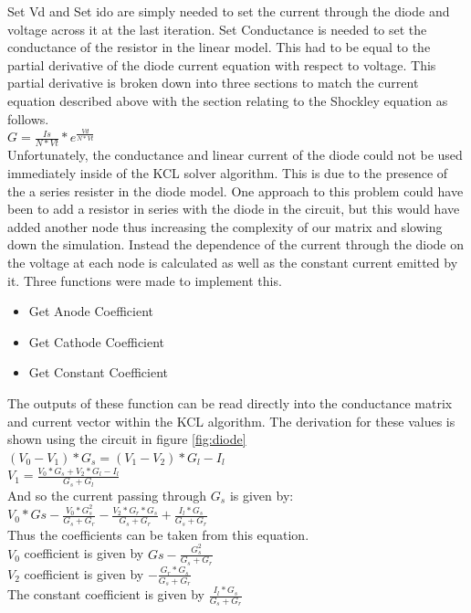 \documentclass{article}
\begin{document}
Set Vd and Set ido are simply needed to set the current through the diode and voltage across it at the last iteration. Set Conductance is needed to set the conductance of the resistor in the linear model. This had to be equal to the partial derivative of the diode current equation with respect to voltage. This partial derivative is broken down into three sections to match the current equation described above with the section relating to the Shockley equation as follows.\bigbreak
\\$G = \frac{Is}{N*Vt}*e^{\frac{Vd}{N*Vt}}$\\\bigbreak
Unfortunately, the conductance and linear current of the diode could not be used immediately inside of the KCL solver algorithm. This is due to the presence of the a series resister in the diode model. One approach to this problem could have been to add a resistor in series with the diode in the circuit, but this would have added another node thus increasing the complexity of our matrix and slowing down the simulation. Instead the dependence of the current through the diode on the voltage at each node is calculated as well as the constant current emitted by it. Three functions were made to implement this. 
\begin{itemize}
    \item Get Anode Coefficient
    \item Get Cathode Coefficient
    \item Get Constant Coefficient
\end{itemize}
The outputs of these function can be read directly into the conductance matrix and current vector within the KCL algorithm. The derivation for these values is shown using the circuit in figure \ref{fig:diode}\bigbreak
\\$(V_0-V_1)*G_s = (V_1-V_2)*G_l - I_l$\bigbreak
\\$V_1 = \frac{V_0*G_s + V_2*G_l - I_l}{G_s+G_l}$\bigbreak
\\And so the current passing through $G_s$ is given by:\bigbreak
\\$V_0*Gs - \frac{V_0*G_s^2}{G_s+G_r} - \frac{V_2*G_r*G_s}{G_s+G_r} + \frac{I_l*G_s}{G_s+G_r}$\bigbreak
\\Thus the coefficients can be taken from this equation. \bigbreak
\\$V_0$ coefficient is given by $Gs - \frac{G_s^2}{G_s+G_r}$\bigbreak
\\$V_2$ coefficient is given by $- \frac{G_r*G_s}{G_s+G_r}$\bigbreak
\\The constant coefficient is given by $\frac{I_l*G_s}{G_s+G_r}$\bigbreak
\end{document}
